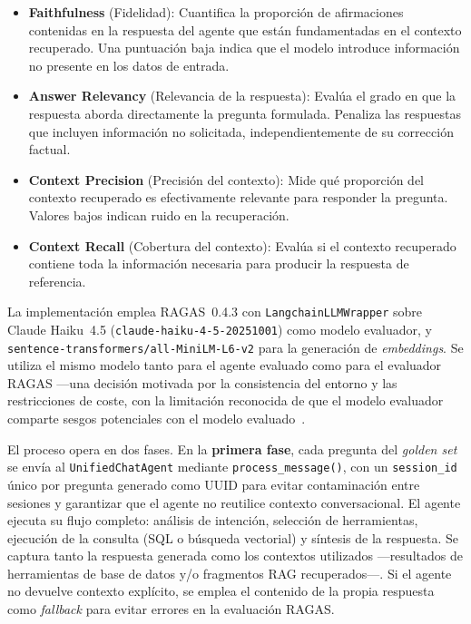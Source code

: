 \begin{itemize}[nosep, leftmargin=*]
  \item \textbf{Faithfulness} (Fidelidad): Cuantifica la proporción de afirmaciones contenidas en la respuesta del agente que están fundamentadas en el contexto recuperado. Una puntuación baja indica que el modelo introduce información no presente en los datos de entrada.
  \item \textbf{Answer Relevancy} (Relevancia de la respuesta): Evalúa el grado en que la respuesta aborda directamente la pregunta formulada. Penaliza las respuestas que incluyen información no solicitada, independientemente de su corrección factual.
  \item \textbf{Context Precision} (Precisión del contexto): Mide qué proporción del contexto recuperado es efectivamente relevante para responder la pregunta. Valores bajos indican ruido en la recuperación.
  \item \textbf{Context Recall} (Cobertura del contexto): Evalúa si el contexto recuperado contiene toda la información necesaria para producir la respuesta de referencia.
\end{itemize}

La implementación emplea \ac{RAGAS}~0.4.3 con \texttt{LangchainLLMWrapper} sobre Claude Haiku~4.5 (\texttt{claude-haiku-4-5-20251001}) como modelo evaluador, y \texttt{sentence-transformers/all-MiniLM-L6-v2} para la generación de \textit{embeddings}. Se utiliza el mismo modelo tanto para el agente evaluado como para el evaluador \ac{RAGAS} ---una decisión motivada por la consistencia del entorno y las restricciones de coste, con la limitación reconocida de que el modelo evaluador comparte sesgos potenciales con el modelo evaluado~\parencite{Zheng2023llmjudge}.

El proceso opera en dos fases. En la \textbf{primera fase}, cada pregunta del \textit{golden set} se envía al \texttt{UnifiedChatAgent} mediante \texttt{process\_message()}, con un \texttt{session\_id} único por pregunta generado como UUID para evitar contaminación entre sesiones y garantizar que el agente no reutilice contexto conversacional. El agente ejecuta su flujo completo: análisis de intención, selección de herramientas, ejecución de la consulta (\ac{SQL} o búsqueda vectorial) y síntesis de la respuesta. Se captura tanto la respuesta generada como los contextos utilizados ---resultados de herramientas de base de datos y/o fragmentos \ac{RAG} recuperados---. Si el agente no devuelve contexto explícito, se emplea el contenido de la propia respuesta como \textit{fallback} para evitar errores en la evaluación \ac{RAGAS}.

